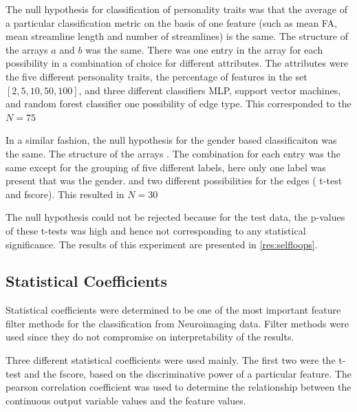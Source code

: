 \documentclass[msthesis.tex]{subfiles}
\begin{document}
The null hypothesis for classification of personality traits was that the average of a particular classification metric on the basis of one feature (such as mean FA, mean streamline length and number of streamlines) is the same. The structure of the arrays $a$ and $b$ was the same.  There was one entry in the array for each possibility in a combination of choice for different attributes. The attributes were the five different personality traits, the percentage of features in the set $[2,5,10,50,100]$, and three different classifiers MLP, support vector machines, and random forest classifier one possibility of edge type. This corresponded to the $N=75$

In a similar fashion, the null hypothesis for the gender based classificaiton was the same. The structure of the arrays . The combination for each entry was the same except for the grouping of five different labels, here only one label was present that was the gender. and two different possibilities for the edges ( t-test and fscore). This resulted in $N=$30


The null hypothesis could not be rejected because for the test data, the p-values of these t-tests was high and hence not corresponding to any statistical significance. The results of this experiment are presented in \autoref{res:selfloops}. 

\subsection{Statistical Coefficients}
\label{subsub:statcoef}

Statistical coefficients were determined to be one of the most important feature filter methods for the classification from Neuroimaging data. Filter methods were used since they do not compromise on interpretability of the results.

Three different statistical coefficients were used mainly. The first two were the t-test and the fscore, based on the discriminative power of a particular feature. The pearson correlation coefficient was used to determine the relationship between the continuous output variable values and the feature values. 
\end{document}
